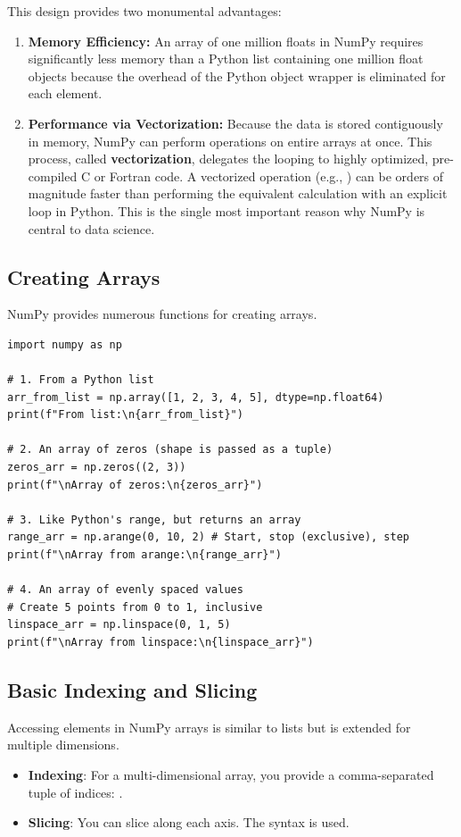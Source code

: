 This design provides two monumental advantages:
\begin{enumerate}
    \item \textbf{Memory Efficiency:} An array of one million floats in NumPy requires significantly less memory than a Python list containing one million float objects because the overhead of the Python object wrapper is eliminated for each element.
    \item \textbf{Performance via Vectorization:} Because the data is stored contiguously in memory, NumPy can perform operations on entire arrays at once. This process, called \textbf{vectorization}, delegates the looping to highly optimized, pre-compiled C or Fortran code. A vectorized operation (e.g., ) can be orders of magnitude faster than performing the equivalent calculation with an explicit  loop in Python. This is the single most important reason why NumPy is central to data science.
\end{enumerate}

\subsection{Creating Arrays}
\label{subsec:numpy_creation}
NumPy provides numerous functions for creating arrays.
\text{ }\begin{verbatim}
import numpy as np

# 1. From a Python list
arr_from_list = np.array([1, 2, 3, 4, 5], dtype=np.float64)
print(f"From list:\n{arr_from_list}")

# 2. An array of zeros (shape is passed as a tuple)
zeros_arr = np.zeros((2, 3))
print(f"\nArray of zeros:\n{zeros_arr}")

# 3. Like Python's range, but returns an array
range_arr = np.arange(0, 10, 2) # Start, stop (exclusive), step
print(f"\nArray from arange:\n{range_arr}")

# 4. An array of evenly spaced values
# Create 5 points from 0 to 1, inclusive
linspace_arr = np.linspace(0, 1, 5)
print(f"\nArray from linspace:\n{linspace_arr}")
\end{verbatim}

\subsection{Basic Indexing and Slicing}
\label{subsec:numpy_indexing}
Accessing elements in NumPy arrays is similar to lists but is extended for multiple dimensions.
\begin{itemize}
    \item \textbf{Indexing}: For a multi-dimensional array, you provide a comma-separated tuple of indices: .
    \item \textbf{Slicing}: You can slice along each axis. The syntax  is used.
\end{itemize}

